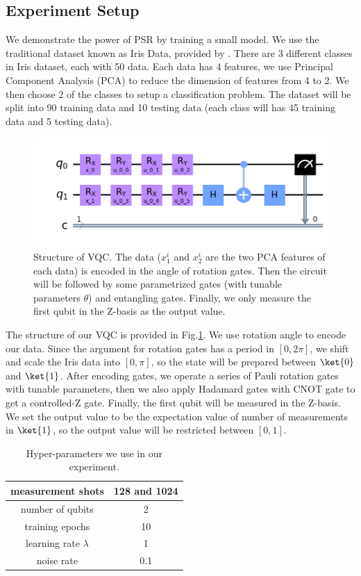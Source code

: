 \documentclass{article}
\begin{document}
\subsection{Experiment Setup}
We demonstrate the power of PSR by training a small model. We use the traditional dataset known as Iris Data, provided by \cite{iris}. There are 3 different classes in Iris dataset, each with 50 data. Each data has 4 features, we use Principal Component Analysis (PCA) to reduce the dimension of features from 4 to 2. We then choose 2 of the classes to setup a classification problem. The dataset will be split into 90 training data and 10 testing data (each class will has 45 training data and 5 testing data).
\begin{figure}
    \centering
    \includegraphics[scale=0.5]{vqc_2.png}
    \caption{Structure of VQC. The data ($x^i_1$ and $x^i_2$ are the two PCA features of each data) is encoded in the angle of rotation gates. Then the circuit will be followed by some parametrized gates (with tunable parameters $\theta$) and entangling gates. Finally, we only measure the first qubit in the Z-basis as the output value.}
    \label{vqc_2}
\end{figure}
The structure of our VQC is provided in Fig.\ref{vqc_2}. We use rotation angle to encode our data. Since the argument for rotation gates has a period in $[0,2\pi]$, we shift and scale the Iris data into $[0,\pi]$, so the state will be prepared between $\ket{0}$ and $\ket{1}$. After encoding gates, we operate a series of Pauli rotation gates with tunable parameters, then we also apply Hadamard gates with CNOT gate to get a controlled-Z gate. Finally, the first qubit will be measured in the Z-basis. We set the output value to be the expectation value of number of measurements in $\ket{1}$, so the output value will be restricted between $[0,1]$.

\begin{table}
    \begin{center}
    \caption{Hyper-parameters we use in our experiment.}
    \label{hyperpara}
    \begin{tabular}{ | c | c | }
        \hline
        measurement shots & 128 and 1024 \\
        \hline
        number of qubits & 2 \\ 
        \hline
        training epochs & 10 \\
        \hline
        learning rate $\lambda$ & 1 \\
        \hline
        noise rate & 0.1 \\
        \hline
    \end{tabular}
    \end{center}
\end{table}
\end{document}
